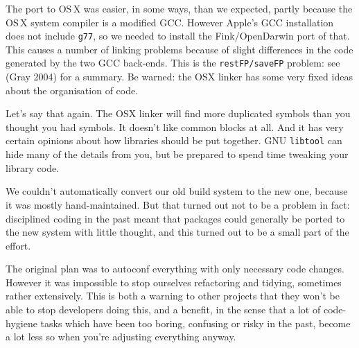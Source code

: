 \documentclass[11pt,twoside]{article}
\begin{document}
The port to OS\,X was easier, in some ways, than we expected, partly
because the OS\,X system compiler is a modified GCC.  However Apple's
GCC installation does not include \texttt{g77}, so we needed to
install the Fink/OpenDarwin port of that.  This causes a number of
linking problems because of slight differences in the code generated
by the two GCC back-ends.  This is the \texttt{restFP/saveFP} problem:
see (Gray 2004) for a summary.  Be warned: the OSX linker has some
very fixed ideas about the organisation of code.

Let's say that again.  The OSX linker will find more duplicated
symbols than you thought you had symbols.  It doesn't like common
blocks at all.  And it has very certain opinions about how libraries
should be put together.  GNU \texttt{libtool} can hide many of the
details from you, but be prepared to spend time tweaking your library
code.

We couldn't automatically convert our old build system to the new one,
because it was mostly hand-maintained.  But that turned out not to be
a problem in fact: disciplined coding in the past meant that packages
could generally be ported to the new system with little thought, and
this turned out to be a small part of the effort.

The original plan was to autoconf everything with only necessary code
changes.  However it was impossible to stop ourselves refactoring and
tidying, sometimes rather extensively.  This is both a warning to
other projects that they won't be able to stop developers doing this,
and a benefit, in the sense that a lot of code-hygiene tasks which
have been too boring, confusing or risky in the past, become a lot
less so when you're adjusting everything anyway.

\end{document}
